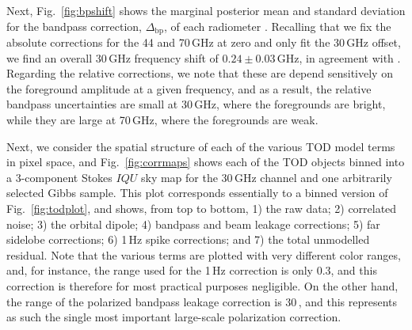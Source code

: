 \documentclass[onecolumn]{aa}
\newcommand{\BP}{\textsc{BeyondPlanck}}
\begin{document}




Next, Fig.~\ref{fig:bpshift} shows the marginal posterior mean and
standard deviation for the bandpass correction,
$\Delta_{\mathrm{bp}}$, of each radiometer \citep{bp09}. Recalling
that we fix the absolute corrections for the 44 and 70\,GHz at zero
and only fit the 30\,GHz offset, we find an overall 30\,GHz frequency
shift of $0.24\pm0.03\,\mathrm{GHz}$, in agreement with
\citet{planck2014-a12}. Regarding the relative corrections, we note
that these are depend sensitively on the foreground amplitude at a
given frequency, and as a result, the relative bandpass uncertainties
are small at 30\,GHz, where the foregrounds are bright, while they are
large at 70\,GHz, where the foregrounds are weak.

Next, we consider the spatial structure of each of the various TOD
model terms in pixel space, and Fig.~\ref{fig:corrmaps} shows each of
the TOD objects binned into a 3-component Stokes $IQU$ sky map for the
30\,GHz channel and one arbitrarily selected Gibbs sample. This plot
corresponds essentially to a binned version of Fig.~\ref{fig:todplot},
and shows, from top to bottom, 1) the raw data; 2) correlated noise;
3) the orbital dipole; 4) bandpass and beam leakage corrections; 5)
far sidelobe corrections; 6) 1\,Hz spike corrections; and 7) the total
unmodelled residual. Note that the various terms are plotted with very
different color ranges, and, for instance, the range used for the
1\,Hz correction is only 0.3\muK, and this correction is therefore for
most practical purposes negligible. On the other hand, the range of
the polarized bandpass leakage correction is 30\,\muK, and this
represents as such the single most important large-scale polarization
correction. 
\end{document}
